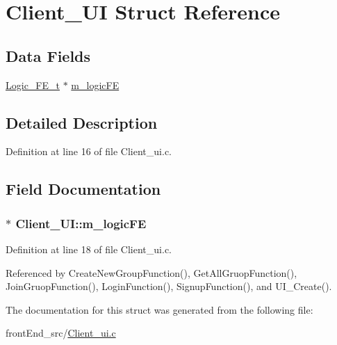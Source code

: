 \hypertarget{structClient__UI}{}\section{Client\+\_\+\+UI Struct Reference}
\label{structClient__UI}
\subsection*{Data Fields}
\begin{DoxyCompactItemize}
\item 
\hyperlink{Client__ui_8h_adc22b842bed5c7e594f04d5f5a110b2c}{Logic\+\_\+\+F\+E\+\_\+t} $\ast$ \hyperlink{structClient__UI_af67660e6f7e5a97a2db9703f994b1792}{m\+\_\+logic\+FE}
\end{DoxyCompactItemize}


\subsection{Detailed Description}


Definition at line 16 of file Client\+\_\+ui.\+c.



\subsection{Field Documentation}
\subsubsection[{\texorpdfstring{m\+\_\+logic\+FE}{m_logicFE}}]{$\ast$ Client\+\_\+\+U\+I\+::m\+\_\+logic\+FE}\hypertarget{structClient__UI_af67660e6f7e5a97a2db9703f994b1792}{}\label{structClient__UI_af67660e6f7e5a97a2db9703f994b1792}


Definition at line 18 of file Client\+\_\+ui.\+c.



Referenced by Create\+New\+Group\+Function(), Get\+All\+Gruop\+Function(), Join\+Gruop\+Function(), Login\+Function(), Signup\+Function(), and U\+I\+\_\+\+Create().



The documentation for this struct was generated from the following file\+:\begin{DoxyCompactItemize}
\item 
front\+End\+\_\+src/\hyperlink{Client__ui_8c}{Client\+\_\+ui.\+c}\end{DoxyCompactItemize}

